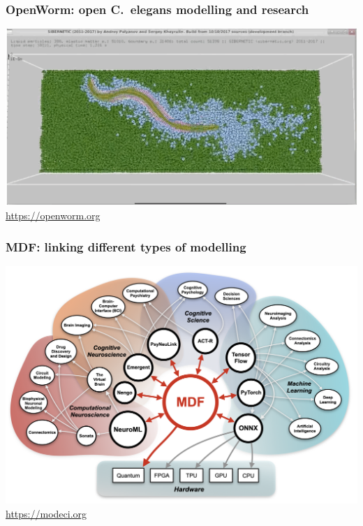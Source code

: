\begin{frame}[c]
  \frametitle{OpenWorm: open C.\ elegans modelling and research}
  \begin{center}
    \includegraphics[keepaspectratio,width=\textwidth]{./99_images/sibernetic}\vspace{1ex}
    \url{https://openworm.org}
  \end{center}
\end{frame}
\begin{frame}[c]
  \frametitle{MDF: linking different types of modelling}
  \begin{center}
    \includegraphics[keepaspectratio,width=\textwidth]{./99_images/mdf}\vspace{1ex}
    \url{https://modeci.org}
  \end{center}
\end{frame}

